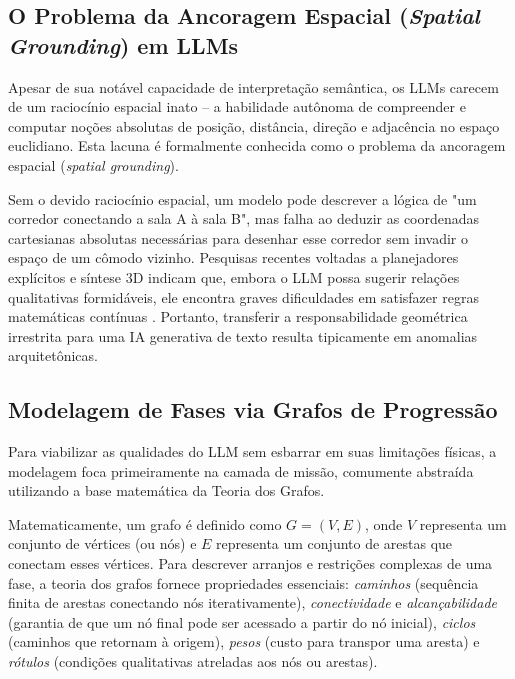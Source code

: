 \subsection{O Problema da Ancoragem Espacial (\textit{Spatial Grounding}) em LLMs}
\label{sec:spatial_grounding}

Apesar de sua notável capacidade de interpretação semântica, os LLMs carecem de um raciocínio espacial inato -- a habilidade autônoma de compreender e computar noções absolutas de posição, distância, direção e adjacência no espaço euclidiano. Esta lacuna é formalmente conhecida como o problema da ancoragem espacial (\textit{spatial grounding}). 

Sem o devido raciocínio espacial, um modelo pode descrever a lógica de "um corredor conectando a sala A à sala B", mas falha ao deduzir as coordenadas cartesianas absolutas necessárias para desenhar esse corredor sem invadir o espaço de um cômodo vizinho. Pesquisas recentes voltadas a planejadores explícitos e síntese 3D indicam que, embora o LLM possa sugerir relações qualitativas formidáveis, ele encontra graves dificuldades em satisfazer regras matemáticas contínuas \cite{sun2024roomplanner, hu2024scenecraft}. Portanto, transferir a responsabilidade geométrica irrestrita para uma IA generativa de texto resulta tipicamente em anomalias arquitetônicas.

\subsection{Modelagem de Fases via Grafos de Progressão}
\label{sec:grafos}

Para viabilizar as qualidades do LLM sem esbarrar em suas limitações físicas, a modelagem foca primeiramente na camada de missão, comumente abstraída utilizando a base matemática da Teoria dos Grafos. 

Matematicamente, um grafo é definido como $G = (V, E)$, onde $V$ representa um conjunto de vértices (ou nós) e $E$ representa um conjunto de arestas que conectam esses vértices. Para descrever arranjos e restrições complexas de uma fase, a teoria dos grafos fornece propriedades essenciais: \textit{caminhos} (sequência finita de arestas conectando nós iterativamente), \textit{conectividade} e \textit{alcançabilidade} (garantia de que um nó final pode ser acessado a partir do nó inicial), \textit{ciclos} (caminhos que retornam à origem), \textit{pesos} (custo para transpor uma aresta) e \textit{rótulos} (condições qualitativas atreladas aos nós ou arestas).

